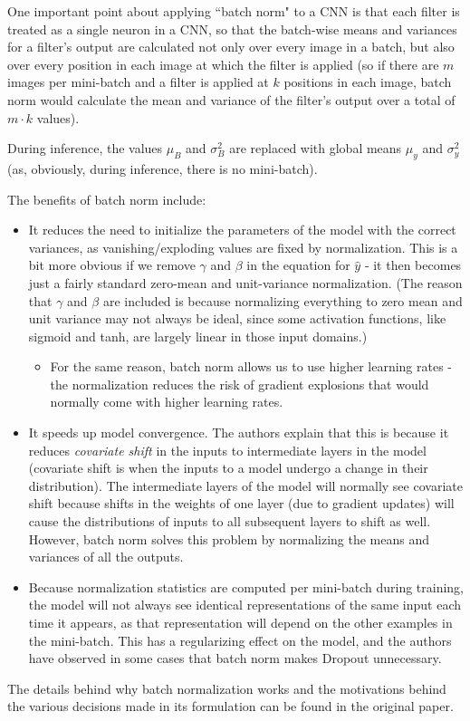 One important point about applying ``batch norm" to a CNN is that each filter is treated as a single neuron in a CNN, so that the batch-wise means and variances for a filter's output are calculated not only over every image in a batch, but also over every position in each image at which the filter is applied (so if there are $m$ images per mini-batch and a filter is applied at $k$ positions in each image, batch norm would calculate the mean and variance of the filter's output over a total of $m \cdot k$ values).

During inference, the values $\mu_B$ and $\sigma_B^2$ are replaced with global means $\mu_y$ and $\sigma_y^2$ (as, obviously, during inference, there is no mini-batch).

The benefits of batch norm include:
\begin{itemize}
\item It reduces the need to initialize the parameters of the model with the correct variances, as vanishing/exploding values are fixed by normalization. This is a bit more obvious if we remove $\gamma$ and $\beta$ in the equation for $\hat{y}$ - it then becomes just a fairly standard zero-mean and unit-variance normalization. (The reason that $\gamma$ and $\beta$ are included is because normalizing everything to zero mean and unit variance may not always be ideal, since some activation functions, like sigmoid and tanh, are largely linear in those input domains.)
\begin{itemize}
\item For the same reason, batch norm allows us to use higher learning rates - the normalization reduces the risk of gradient explosions that would normally come with higher learning rates.
\end{itemize}
\item It speeds up model convergence. The authors explain that this is because it reduces \emph{covariate shift} in the inputs to intermediate layers in the model (covariate shift is when the inputs to a model undergo a change in their distribution). The intermediate layers of the model will normally see covariate shift because shifts in the weights of one layer (due to gradient updates) will cause the distributions of inputs to all subsequent layers to shift as well. However, batch norm solves this problem by normalizing the means and variances of all the outputs.
\item Because normalization statistics are computed per mini-batch during training, the model will not always see identical representations of the same input each time it appears, as that representation will depend on the other examples in the mini-batch. This has a regularizing effect on the model, and the authors have observed in some cases that batch norm makes Dropout unnecessary.
\end{itemize}
The details behind why batch normalization works and the motivations behind the various decisions made in its formulation can be found in the original paper.

